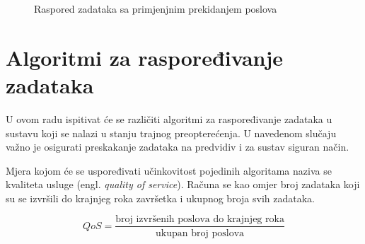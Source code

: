 \documentclass[../zavrsni.tex]{subfiles}
\begin{document}
\begin{figure}[h!]
  \centering

  \begin{RTGrid}[width=13cm]{3}{24}

  

  

  

  \end{RTGrid}

  \caption{Raspored zadataka sa primjenjnim prekidanjem poslova}
  \label{fig:ex1}
\end{figure}

\section{Algoritmi za raspoređivanje zadataka}

U ovom radu ispitivat će se različiti algoritmi za raspoređivanje zadataka u sustavu koji se nalazi u stanju trajnog preopterećenja.
U navedenom slučaju važno je osigurati preskakanje zadataka na predvidiv i za sustav siguran način.

Mjera kojom će se uspoređivati učinkovitost pojedinih algoritama naziva se kvaliteta usluge (engl. \textit{quality of service}).
Računa se kao omjer broj zadataka koji su se izvršili do krajnjeg roka završetka i ukupnog broja svih zadataka.

\begin{equation*}
    QoS = \frac{\text{broj izvršenih poslova do krajnjeg roka}}{\text{ukupan broj poslova}}
\end{equation*}
\end{document}
